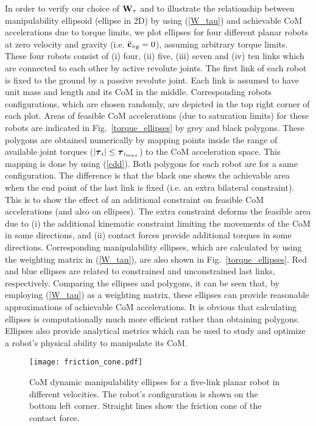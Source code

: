 In order to verify our choice of $\mathbf{W}_\tau$ and to illustrate the relationship
between manipulability ellipsoid (ellipse in 2D) by using (\ref{W_tau}) and
achievable CoM accelerations due to torque limits, we plot ellipses for four
different planar robots at zero velocity and gravity
(i.e. $\ddot{\mathbf{c}}_{vg}=0$), assuming arbitrary torque limits.  These four
robots consist of (i) four, (ii) five, (iii) seven and (iv) ten links which
are connected to each other by active revolute joints.  The first link of each
robot is fixed to the ground by a passive revolute joint.  Each link is
assumed to have unit mass and length and its CoM in the middle.  Corresponding
robots configurations, which are chosen randomly, are depicted in the top
right corner of each plot.  Areas of feasible CoM accelerations (due to
saturation limits) for these robots are indicated in
Fig.~\ref{torque_ellipses} by grey and black polygons.  These polygons are
obtained numerically by mapping points inside the range of available joint
torques ($|\boldsymbol{\tau}_i| \leq \boldsymbol{\tau}_{i_{max}}$) to the CoM acceleration space.
This mapping is done by using (\ref{cdd}).  Both polygons for each robot are
for a same configuration.  The difference is that the black one shows the
achievable area when the end point of the last link is fixed (i.e. an extra
bilateral constraint).  This is to show the effect of an additional constraint
on feasible CoM accelerations (and also on ellipses).  The extra constraint
deforms the feasible area due to (i) the additional kinematic constraint
limiting the movements of the CoM in some directions, and (ii) contact forces
provide additional torques in some directions.  Corresponding manipulability
ellipses, which are calculated by using the weighting matrix in (\ref{W_tau}),
are also shown in Fig.~\ref{torque_ellipses}.  Red and blue ellipses are
related to constrained and unconstrained last links, respectively.  Comparing
the ellipses and polygons, it can be seen that, by employing (\ref{W_tau}) as
a weighting matrix, these ellipses can provide reasonable approximations of
achievable CoM accelerations.  It is obvious that calculating ellipses is
computationally much more efficient rather than obtaining polygons.  Ellipses
also provide analytical metrics which can be used to study and optimize a
robot's physical ability to manipulate its CoM.
%
\begin{figure}
	\centering
	\texttt{[image: friction\_cone.pdf]}
	\caption{CoM dynamic manipulability ellipses for a five-link planar robot in
		different velocities.  The robot's configuration is shown on the bottom
		left corner.  Straight lines show the friction cone of the contact force.}
	\label{friction_cone}
\end{figure}
%

